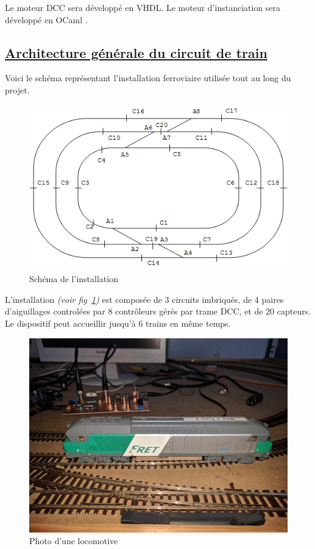 Le moteur DCC sera développé en VHDL. Le moteur d'instanciation sera
développé en OCaml \cite{OCAML}.


\newpage
\subsection{\underline{Architecture g\'en\'erale du circuit de train}}
\label{sec:archi}

Voici le sch\'ema repr\'esentant l'installation ferroviaire utilis\'ee
tout au long du projet. 

\begin{figure}[h]
\centering
\includegraphics[scale=0.80]{circuit.png}
\caption{Sch\'ema de l'installation}
\label{fig4}
\end{figure}

L'installation \emph{(voir fig~\ref{fig4})} est compos\'ee de 3
circuits imbriqués, de 4 paires d'aiguillages control\'ees par 8
contr\^oleurs gérés par trame DCC, et de 20 capteurs.
Le dispositif peut accueillir jusqu'\`a 6 trains en m\^eme temps.

\begin{figure}[h]
\centering
\includegraphics[scale=0.3]{loco.jpg}
\caption{Photo d'une locomotive}
\label{fig5}
\end{figure}

